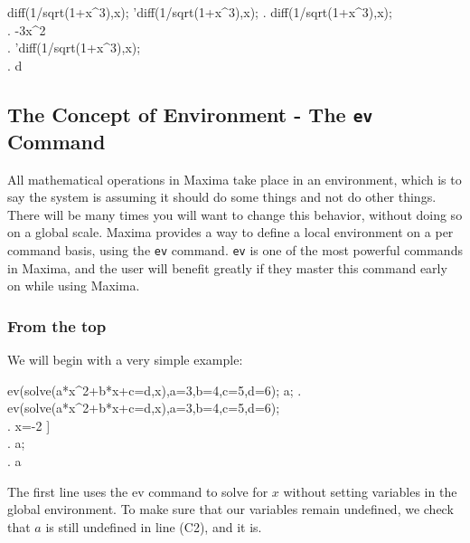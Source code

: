 \label{Evaluation Toggle (Example 6)}

\beginmaximasession
diff(1/sqrt(1+x^3),x);
'diff(1/sqrt(1+x^3),x);
\maximatexsession
{}.  diff(1/sqrt(1+x^3),x); \\
.   -{{3\*x^{2}}} \\
.  'diff(1/sqrt(1+x^3),x); \\
.   {{d}} \\
\endmaximasession

\vspace{3ex}

\subsection{The Concept of Environment - The \texttt{ev} Command}

All mathematical operations in Maxima take place in an environment,
which is to say the system is assuming it should do some things and
not do other things. There will be many times you will want to change
this behavior, without doing so on a global scale. Maxima provides
a way to define a local environment on a per command basis, using
the \texttt{ev} command. \texttt{ev} is one of the most powerful commands
in Maxima, and the user will benefit greatly if they master this command
early on while using Maxima. 


\subsubsection{From the top}

We will begin with a very simple example:

\vspace{3ex}

\label{Basic Use of ev Command (Example 7)}

\beginmaximasession
ev(solve(a*x^2+b*x+c=d,x),a=3,b=4,c=5,d=6);
a;
\maximatexsession
{}.  ev(solve(a*x^2+b*x+c=d,x),a=3,b=4,c=5,d=6); \\
.   \left[ x=-{{\sqrt{7}+2}\over{3}},\linebreak[0]x={{-2
 }} \right]  \\
.  a; \\
.   a \\
\endmaximasession

\vspace{3ex}

The first line uses the ev command to solve for \( x \) without setting
variables in the global environment. To make sure that our variables
remain undefined, we check that \( a \) is still undefined in line
(C2), and it is.

